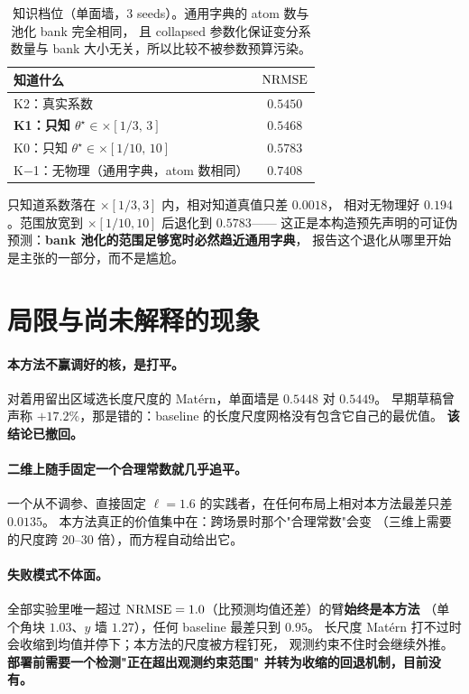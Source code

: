 \documentclass[11pt,a4paper]{article}
\begin{document}
\begin{table}[t]
\centering
\caption{知识档位（单面墙，$3$ seeds）。通用字典的 atom 数与池化 bank 完全相同，
且 collapsed 参数化保证变分系数量与 bank 大小无关，所以比较不被参数预算污染。}
\label{tab:ladder}
\begin{tabular}{lc}
\toprule
知道什么 & $\mathrm{NRMSE}$ \\
\midrule
K2：真实系数 & $0.5450$ \\
\textbf{K1：只知 $\theta^\star \in \times[1/3,\,3]$} & $\mathbf{0.5468}$ \\
K0：只知 $\theta^\star \in \times[1/10,\,10]$ & $0.5783$ \\
K$-$1：无物理（通用字典，atom 数相同） & $0.7408$ \\
\bottomrule
\end{tabular}
\end{table}

只知道系数落在 $\times[1/3, 3]$ 内，相对知道真值只差 $0.0018$，
相对无物理好 $0.194$。范围放宽到 $\times[1/10, 10]$ 后退化到 $0.5783$——
这正是本构造预先声明的可证伪预测：\textbf{bank 池化的范围足够宽时必然趋近通用字典}，
报告这个退化从哪里开始是主张的一部分，而不是尴尬。

\section{局限与尚未解释的现象}

\paragraph{本方法不赢调好的核，是打平。}
对着用留出区域选长度尺度的 Matérn，单面墙是 $0.5448$ 对 $0.5449$。
早期草稿曾声称 $+17.2\%$，那是错的：baseline 的长度尺度网格没有包含它自己的最优值。
\textbf{该结论已撤回。}

\paragraph{二维上随手固定一个合理常数就几乎追平。}
一个从不调参、直接固定 $\ell = 1.6$ 的实践者，在任何布局上相对本方法最差只差 $0.0135$。
本方法真正的价值集中在：跨场景时那个"合理常数"会变
（三维上需要的尺度跨 $20$--$30$ 倍），而方程自动给出它。

\paragraph{失败模式不体面。}
全部实验里唯一超过 $\mathrm{NRMSE} = 1.0$（比预测均值还差）的臂\textbf{始终是本方法}
（单个角块 $1.03$、$y$ 墙 $1.27$），任何 baseline 最差只到 $0.95$。
长尺度 Matérn 打不过时会收缩到均值并停下；本方法的尺度被方程钉死，
观测约束不住时会继续外推。\textbf{部署前需要一个检测"正在超出观测约束范围"
并转为收缩的回退机制，目前没有。}
\end{document}
